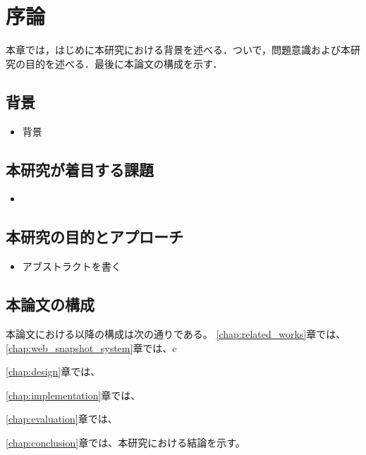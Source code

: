 \chapter{序論}
\label{chap:introduction}
本章では，はじめに本研究における背景を述べる．ついで，問題意識および本研究の目的を述べる．最後に本論文の構成を示す．

\section{背景}
\label{section:background}
\begin{itemize}
      \item  背景
\end{itemize}

\section{本研究が着目する課題}
\begin{itemize}
      \item  
\end{itemize}

\section{本研究の目的とアプローチ}
\begin{itemize}
      \item  アブストラクトを書く
\end{itemize}

\section{本論文の構成}

本論文における以降の構成は次の通りである。
\ref{chap:related_works}章では、
\ref{chap:web_snapshot_system}章では、c

\ref{chap:design}章では、

\ref{chap:implementation}章では、

\ref{chap:evaluation}章では、

\ref{chap:conclusion}章では、本研究における結論を示す。